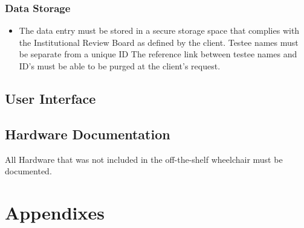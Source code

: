 \documentclass[onecolumn, draftclsnofoot,10pt, compsoc]{IEEEtran}
\begin{document}
\subsubsection{Data Storage}
\begin{itemize}
	\item The data entry must be stored in a secure storage space that complies with the Institutional Review Board as defined by the client.
	\subitem Testee names must be separate from a unique ID
	\subitem The reference link between testee names and ID's must be able to be purged at the client's request.
\end{itemize}
\subsection{User Interface}
\subsection{Hardware Documentation}
All Hardware that was not included in the off-the-shelf wheelchair must be documented.
\section{Appendixes}
\end{document}

